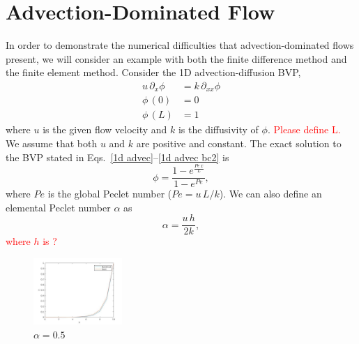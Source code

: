 \section{Advection-Dominated Flow}
In order to demonstrate the numerical difficulties that advection-dominated flows present, we will consider an example with both the finite difference method and the finite element method. Consider the 1D advection-diffusion BVP,
\begin{align}
    \label{1d advec}
    u\, \partial_{x}\phi &= k\, \partial_{xx}\phi
    \\
    \label{1d advec bc1}
    \phi\,(0) &= 0
    \\
    \label{1d advec bc2}
    \phi\,(L) &= 1
\end{align}
where $u$ is the given flow velocity and $k$ is the diffusivity of $\phi$. \textcolor{red}{Please define L.} We assume that both $u$ and $k$ are positive and constant. The exact solution to the BVP stated in Eqs.~\eqref{1d advec}--\eqref{1d advec bc2} is
\begin{equation}
    \phi= \frac{1-e^{\frac{Pe\,x}{L}}}{1-e^{Pe}},
\end{equation}
where $Pe$ is the global Peclet number ($Pe=u\,L/k$). We can also define an elemental Peclet number $\alpha$ as
\begin{equation}
    \alpha=\frac{u\,h}{2k},
\end{equation}
\textcolor{red}{where $h$ is ?}
\begin{figure}
    \centering
        \includegraphics[width=0.3\textwidth]{../Chapter-1/Figures/alpha_5}
        \caption{$\alpha=0.5$}
\end{figure}